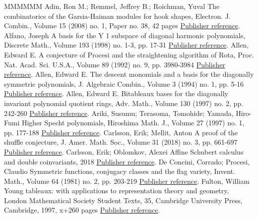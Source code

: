 \begin{thebibliography}{MMMMMM}
 Adin, Ron M.; Remmel, Jeffrey B.; Roichman, Yuval The combinatorics of the Garsia-Haiman modules for hook shapes, Electron. J. Combin., Volume 15 (2008) no. 1, Paper no. 38, 42 pages \href{https://alco.centre-mersenne.org/articles/10.5802/alco.396/#HookBases}{Publisher reference}.
 Alfano, Joseph A basis for the Y 1  subspace of diagonal harmonic polynomials, Discrete Math., Volume 193 (1998) no. 1-3, pp. 17-31 \href{https://alco.centre-mersenne.org/articles/10.5802/alco.396/#Alfano}{Publisher reference}.
 Allen, Edward E. A conjecture of Procesi and the straightening algorithm of Rota, Proc. Nat. Acad. Sci. U.S.A., Volume 89 (1992) no. 9, pp. 3980-3984 \href{https://alco.centre-mersenne.org/articles/10.5802/alco.396/#AllenOneVariable}{Publisher reference}.
 Allen, Edward E. The descent monomials and a basis for the diagonally symmetric polynomials, J. Algebraic Combin., Volume 3 (1994) no. 1, pp. 5-16 \href{https://alco.centre-mersenne.org/articles/10.5802/alco.396/#AllenDescentMonomials}{Publisher reference}.
 Allen, Edward E. Bitableaux bases for the diagonally invariant polynomial quotient rings, Adv. Math., Volume 130 (1997) no. 2, pp. 242-260 \href{https://alco.centre-mersenne.org/articles/10.5802/alco.396/#AllenBitableaux1}{Publisher reference}.
 Ariki, Susumu; Terasoma, Tomohide; Yamada, Hiro-Fumi Higher Specht polynomials, Hiroshima Math. J., Volume 27 (1997) no. 1, pp. 177-188 \href{https://alco.centre-mersenne.org/articles/10.5802/alco.396/#ATY}{Publisher reference}.
 Carlsson, Erik; Mellit, Anton A proof of the shuffle conjecture, J. Amer. Math. Soc., Volume 31 (2018) no. 3, pp. 661-697 \href{https://alco.centre-mersenne.org/articles/10.5802/alco.396/#shuffle}{Publisher reference}.
 Carlsson, Erik; Oblomkov, Alexei Affine Schubert calculus and double coinvariants, 2018 \href{https://alco.centre-mersenne.org/articles/10.5802/alco.396/#CarlssonOblomkov}{Publisher reference}.
 De Concini, Corrado; Procesi, Claudio Symmetric functions, conjugacy classes and the flag variety, Invent. Math., Volume 64 (1981) no. 2, pp. 203-219 \href{https://alco.centre-mersenne.org/articles/10.5802/alco.396/#DeConciniProcesi}{Publisher reference}.
 Fulton, William Young tableaux: with applications to representation theory and geometry, London Mathematical Society Student Texts, 35, Cambridge University Press, Cambridge, 1997, x+260 pages \href{https://alco.centre-mersenne.org/articles/10.5802/alco.396/#Fulton}{Publisher reference}.

\end{thebibliography}
